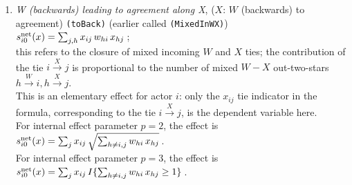 \documentclass[a4paper,fleqn,11pt]{article}
\newcommand{\+}{\, + \,}
\newcommand{\vit}{\theenumi}
\begin{document}
\begin{enumerate}
 \item
\begin{minipage}[t]{.7\textwidth}
{\em  W (backwards) leading to agreement along X}, ($X$: $W$ (backwards) to agreement) \texttt{(toBack)}
 (earlier called \texttt{(MixedInWX)}) \\[0.2em]
 $s^{\rm net}_{i\vit}(x) = \sum_{j, h} x_{ij}\, w_{hi}\, x_{hj}\,$;\\[0.2em]
 this refers to the closure of mixed incoming $W$ and $X$ ties;
 the contribution of the tie $i \stackrel{X}{\rightarrow} j$
 is proportional to
 the number of mixed $W-X$ out-two-stars
 $h \stackrel{W}{\rightarrow} i,  h \stackrel{X}{\rightarrow} j$.\\
 This is an elementary effect for actor $i$:
 only the $x_{ij}$ tie indicator in the formula,
 corresponding to  the tie $i \stackrel{X}{\rightarrow} j$,
 is the dependent variable here.\\
 For internal effect parameter $p = 2$, the effect is  \\[0.2em]
 $s^{\rm net}_{i\vit}(x) = \sum_j x_{ij}\, \sqrt{ \sum_{h \neq i, j} w_{hi}\, x_{hj}}\,$.\\
  For internal effect parameter $p = 3$, the effect is  \\[0.2em]
 $s^{\rm net}_{i\vit}(x) = \sum_j x_{ij}\, I\{ \sum_{h \neq i, j} w_{hi}\, x_{hj} \geq 1\}\,$.


\end{minipage}
\end{enumerate}
\end{document}
